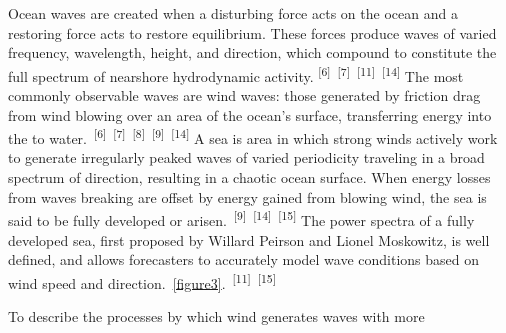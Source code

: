 \documentclass{article}
\begin{document}
{\hspace{.5cm}Ocean waves are created when a disturbing force acts on the ocean and a restoring force acts to restore equilibrium. These forces produce waves of varied frequency, wavelength, height, and direction, which compound to constitute the full spectrum of nearshore hydrodynamic activity. \textsuperscript{[6]}~\textsuperscript{[7]}~\textsuperscript{[11]}~\textsuperscript{[14]} The most commonly observable waves are wind waves: those generated by friction drag from wind blowing over an area of the ocean's surface, transferring energy into the to water.~\textsuperscript{[6]}~\textsuperscript{[7]}~\textsuperscript{[8]}~\textsuperscript{[9]}~\textsuperscript{[14]} A sea is area in which strong winds actively work to generate irregularly peaked waves of varied periodicity traveling in a broad spectrum of direction, resulting in a chaotic ocean surface. When energy losses from waves breaking are offset by energy gained from blowing wind, the sea is said to be fully developed or arisen.~\textsuperscript{[9]}~\textsuperscript{[14]}~\textsuperscript{[15]} The power spectra of a fully developed sea, first proposed by Willard Peirson and Lionel Moskowitz, is well defined, and allows forecasters to accurately model wave conditions based on wind speed and direction.~\cref{figure3}.~\textsuperscript{[11]}~\textsuperscript{[15]}\par}

{To describe the processes by which wind generates waves with more \par}
\end{document}
